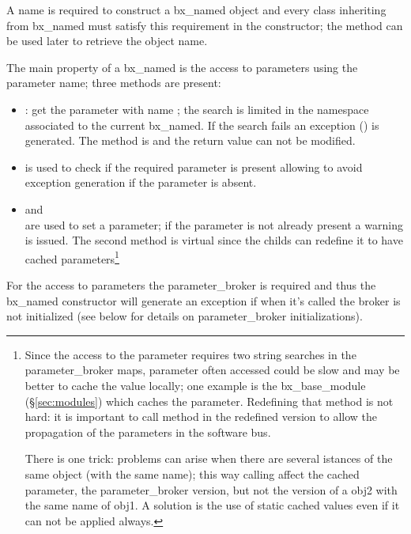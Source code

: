 A name is required to construct a bx\_named object and every class inheriting from bx\_named
must satisfy this requirement in the constructor; the 
\mbox{} method can be used
later to retrieve the object name.

The main property of a bx\_named is the access to parameters using the parameter name; 
three methods are present:
\begin{itemize}
\item \mbox{}:
get the parameter with name ; the search is limited in the namespace associated to the current
bx\_named. If the search fails an exception () is generated. The method is  and
the return value can not be modified.
\item \mbox{} is used to check if
the required parameter is present allowing to avoid exception generation if the parameter is absent.
\item \mbox{} and\\
\mbox{} are used to set a 
parameter; if the parameter is not already present a warning is issued. The second method is virtual since the 
childs can redefine it to have cached parameters\footnote{Since the access to the parameter requires two
string searches in the parameter\_broker maps, parameter often accessed could be slow and may be better to cache the 
value locally; one example is the bx\_base\_module (\S\ref{sec:modules}) which caches the  parameter. 
Redefining that method is not hard: it is important to call \mbox{} method in the 
redefined version to allow the propagation of the parameters in the software bus. 

There is one trick: problems can arise when there are several istances of the same object (with the same name); 
this way calling \mbox{} affect the cached parameter, the parameter\_broker version, 
but not the version of a obj2 with the same name of obj1. A solution is the use of static cached values even if it can
not be applied always.}
\end{itemize}
For the access to parameters the parameter\_broker is required and thus the bx\_named constructor will generate
an exception if when it's called the broker is not initialized (see below for details on parameter\_broker initializations).

